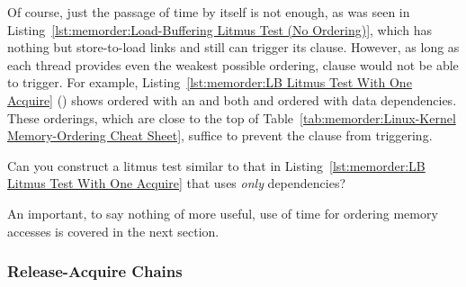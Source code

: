 Of course, just the passage of time by itself is not enough, as
was seen in
Listing~\ref{lst:memorder:Load-Buffering Litmus Test (No Ordering)},
which has nothing but store-to-load links and still can
trigger its  clause.
However, as long as each thread provides even the weakest possible
ordering,  clause would not be able to trigger.
For example,
Listing~\ref{lst:memorder:LB Litmus Test With One Acquire}
()
shows  ordered with an  and
both  and  ordered with data dependencies.
These orderings, which are close to the top of
Table~\ref{tab:memorder:Linux-Kernel Memory-Ordering Cheat Sheet},
suffice to prevent the  clause from triggering.

\QuickQuiz{}
	Can you construct a litmus test similar to that in
	Listing~\ref{lst:memorder:LB Litmus Test With One Acquire}
	that uses \emph{only} dependencies?
 \QuickQuizEnd

An important, to say nothing of more useful, use of time for ordering
memory accesses is covered in the next section.

\subsubsection{Release-Acquire Chains}
\label{sec:memorder:Release-Acquire Chains}

